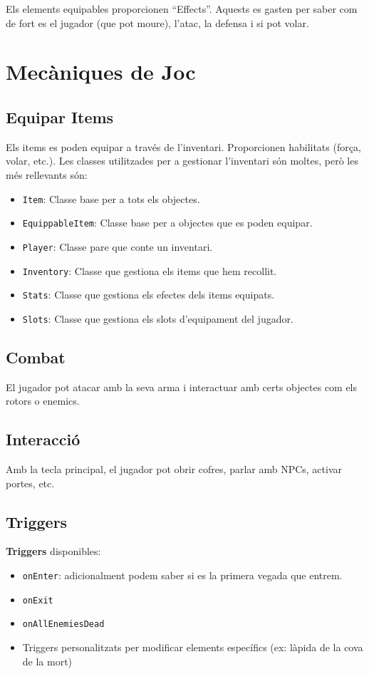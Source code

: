 \documentclass[a4paper,12pt]{article}
\begin{document}
Els elements equipables proporcionen ``Effects''. Aquests es gasten per saber com de fort es el jugador (que pot moure), l'atac, la defensa i si pot volar.

\section{Mecàniques de Joc}

\subsection{Equipar Items}
Els items es poden equipar a través de l'inventari. Proporcionen habilitats (força, volar, etc.). Les classes utilitzades per a gestionar l'inventari són moltes, però les més rellevants són:
\begin{itemize}
    \item \texttt{Item}: Classe base per a tots els objectes.
    \item \texttt{EquippableItem}: Classe base per a objectes que es poden equipar.
    \item \texttt{Player}: Classe pare que conte un inventari.
    \item \texttt{Inventory}: Classe que gestiona els items que hem recollit.
    \item \texttt{Stats}: Classe que gestiona els efectes dels items equipats.
    \item \texttt{Slots}: Classe que gestiona els slots d'equipament del jugador.
\end{itemize}    


\subsection{Combat}
El jugador pot atacar amb la seva arma i interactuar amb certs objectes com els rotors o enemics.

\subsection{Interacció}
Amb la tecla principal, el jugador pot obrir cofres, parlar amb NPCs, activar portes, etc.

\subsection{Triggers}
\textbf{Triggers} disponibles:
\begin{itemize}
    \item \texttt{onEnter}: adicionalment podem saber si es la primera vegada que entrem.
    \item \texttt{onExit}
    \item \texttt{onAllEnemiesDead}
    \item Triggers personalitzats per modificar elements específics (ex: làpida de la cova de la mort)
\end{itemize}
\end{document}
